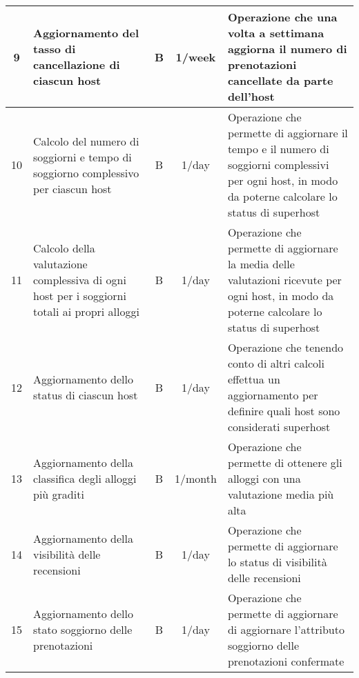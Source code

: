 \begin{longtable}{|c|p{3cm}|c|c|p{4.18cm}|}
    9         & Aggiornamento del tasso di cancellazione di ciascun host                                    & {B}           & 1/week             & Operazione che una volta a settimana aggiorna il numero di prenotazioni cancellate da parte dell'host                                                    \\\hline
    10        & Calcolo del numero di soggiorni e tempo di soggiorno complessivo per ciascun host           & {B}           & 1/day              & {Operazione che permette di aggiornare il tempo e il numero di soggiorni complessivi per ogni host, in modo da poterne calcolare lo status di superhost} \\\hline
    11        & Calcolo della valutazione complessiva di ogni host per i soggiorni totali ai propri alloggi & {B}           & 1/day              & {Operazione che permette di aggiornare la media delle valutazioni ricevute per ogni host, in modo da poterne calcolare lo status di superhost}           \\\hline
    12        & Aggiornamento dello status di ciascun host                                                  & {B}           & 1/day              & Operazione che tenendo conto di altri calcoli effettua un aggiornamento per definire quali host sono considerati superhost                               \\\hline
    13        & Aggiornamento della classifica degli alloggi più graditi                                    & {B}           & 1/month            & Operazione che permette di ottenere gli alloggi con una valutazione media più alta                                                                       \\\hline
    14        & Aggiornamento della visibilità delle recensioni                                             & {B}           & 1/day              & Operazione che permette di aggiornare lo status di visibilità delle recensioni                                                                           \\\hline
    15        & Aggiornamento dello stato soggiorno delle prenotazioni                                      & {B}           & 1/day              & Operazione che permette di aggiornare di aggiornare l'attributo soggiorno delle prenotazioni confermate                                                  \\\hline
\end{longtable}
\normalsize